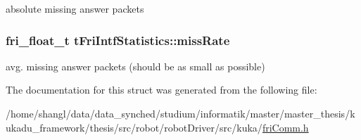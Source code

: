 absolute missing answer packets \hypertarget{structtFriIntfStatistics_a3dd921bc87fa0a6f2f38a528748ce5e0}{
\subsubsection[{miss\-Rate}]{\setlength{\rightskip}{0pt plus 5cm}fri\-\_\-float\-\_\-t {\bf t\-Fri\-Intf\-Statistics\-::miss\-Rate}}}\label{structtFriIntfStatistics_a3dd921bc87fa0a6f2f38a528748ce5e0}
avg. missing answer packets (should be as small as possible) 

\-The documentation for this struct was generated from the following file\-:\begin{DoxyCompactItemize}
\item 
/home/shangl/data/data\-\_\-synched/studium/informatik/master/master\-\_\-thesis/kukadu\-\_\-framework/thesis/src/robot/robot\-Driver/src/kuka/\hyperlink{friComm_8h}{fri\-Comm.\-h}\end{DoxyCompactItemize}
